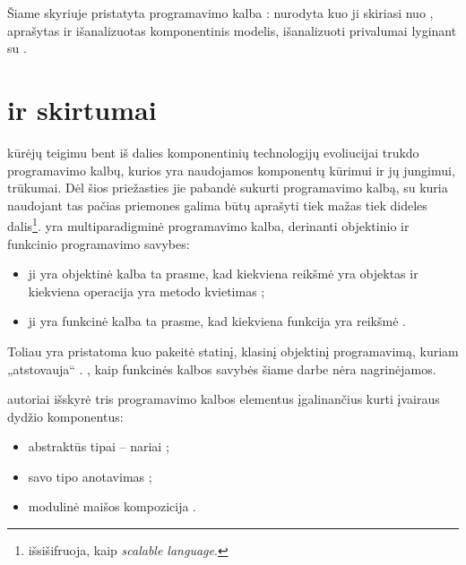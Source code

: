 
Šiame skyriuje pristatyta programavimo kalba :
nurodyta kuo ji skiriasi nuo , aprašytas
ir išanalizuotas  komponentinis modelis,
išanalizuoti  privalumai lyginant su .

\section{ ir  skirtumai}

 kūrėjų \cite[1]{scala-overview} teigimu bent iš
dalies komponentinių technologijų evoliucijai trukdo programavimo
kalbų, kurios yra naudojamos komponentų kūrimui ir jų jungimui,
trūkumai. Dėl šios priežasties jie pabandė sukurti programavimo
kalbą, su kuria naudojant tas pačias priemones galima būtų aprašyti
tiek mažas tiek dideles dalis\footnote{ išsišifruoja,
kaip \emph{scalable language}.}.  yra multiparadigminė
programavimo kalba, derinanti objektinio ir funkcinio programavimo
savybes:
\begin{itemize}
  \item ji yra objektinė kalba ta prasme, kad kiekviena reikšmė
     yra objektas ir kiekviena operacija yra metodo kvietimas
    \cite[3]{scala-overview};
  \item ji yra funkcinė kalba ta prasme, kad kiekviena funkcija yra
    reikšmė .
\end{itemize}
Toliau yra pristatoma kuo  pakeitė statinį, klasinį
objektinį programavimą, kuriam „atstovauja“ .
, kaip funkcinės kalbos savybės šiame darbe nėra
nagrinėjamos.

 autoriai \cite{scalable-component-abstractions}
išskyrė tris programavimo kalbos elementus įgalinančius kurti įvairaus
dydžio  komponentus:
\begin{itemize}
  \item abstraktūs tipai – nariai ;
  \item savo tipo anotavimas ;
  \item modulinė maišos kompozicija .
\end{itemize}

